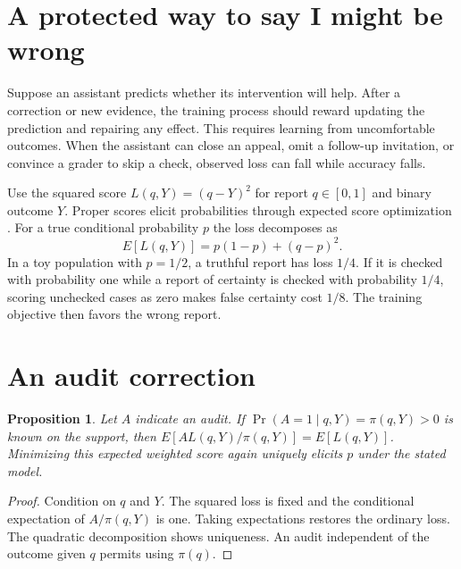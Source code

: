 \documentclass[11pt]{article}
\newtheorem{proposition}{Proposition}
\begin{document}
\section{A protected way to say I might be wrong}
Suppose an assistant predicts whether its intervention will help.
After a correction or new evidence, the training process should
reward updating the prediction and repairing any effect. This
requires learning from uncomfortable outcomes. When the assistant
can close an appeal, omit a follow-up invitation, or convince a
grader to skip a check, observed loss can fall while accuracy falls.

Use the squared score $L(q,Y)=(q-Y)^2$ for report $q\in[0,1]$
and binary outcome $Y$. Proper scores elicit probabilities
through expected score optimization \cite{gneiting}. For a true
conditional probability $p$ the loss decomposes as
\[
 E[L(q,Y)]=p(1-p)+(q-p)^2.
\]
In a toy population with $p=1/2$, a truthful report has loss
$1/4$. If it is checked with probability one while a report of
certainty is checked with probability $1/4$, scoring unchecked
cases as zero makes false certainty cost $1/8$. The training
objective then favors the wrong report.

\section{An audit correction}
\begin{proposition}
Let $A$ indicate an audit. If
$\Pr(A=1\mid q,Y)=\pi(q,Y)>0$ is known on the support, then
$E[A L(q,Y)/\pi(q,Y)]=E[L(q,Y)]$. Minimizing this expected
weighted score again uniquely elicits $p$ under the stated model.
\end{proposition}
\begin{proof}
Condition on $q$ and $Y$. The squared loss is fixed and the
conditional expectation of $A/\pi(q,Y)$ is one. Taking
expectations restores the ordinary loss. The quadratic
decomposition shows uniqueness. An audit independent of the
outcome given $q$ permits using $\pi(q)$.
\end{proof}
\end{document}
